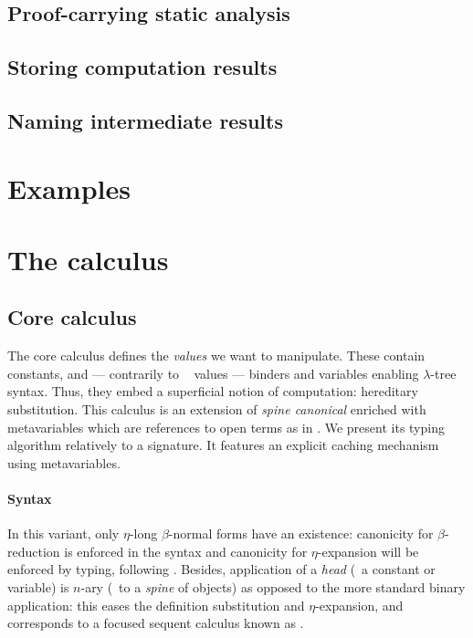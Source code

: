 \documentclass[9pt]{sigplanconf}
\begin{document}
\subsection{Proof-carrying static analysis}

\subsection{Storing computation results}
\subsection{Naming intermediate results}

\section{Examples}



\section{The calculus}

\subsection{Core calculus}

The core calculus defines the \emph{values} we want to
manipulate. These contain constants, and --- contrarily to \eg\
 values --- binders and variables enabling $\lambda$-tree
syntax. Thus, they embed a superficial notion of computation:
hereditary substitution. This calculus is an extension of \emph{spine
  canonical \LF} \cite{pfenning2007term} enriched with metavariables
which are references to open terms as in
\cite{nanevski2008contextual}. We present its typing algorithm
relatively to a signature. It features an explicit caching mechanism
using metavariables.

\paragraph{Syntax}

In this variant, only $\eta$-long $\beta$-normal forms have an
existence: canonicity for $\beta$-reduction is enforced in the syntax
and canonicity for $\eta$-expansion will be enforced by typing,
following \cite{hl07mechanizing}. Besides, application of a
\emph{head} (\ie\ a constant or variable) is $n$-ary (\ie\ to a
\emph{spine} of objects) as opposed to the more standard binary
application: this eases the definition substitution and
$\eta$-expansion, and corresponds to a focused sequent calculus known
as \sysname{LJT} \cite{herbelin1995λ}.
\end{document}
